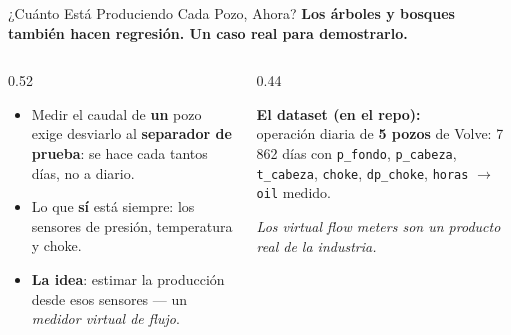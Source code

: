 \documentclass[aspectratio=169, 11pt]{beamer}
\begin{document}
\begin{frame}[shrink=8]{¿Cuánto Está Produciendo Cada Pozo, Ahora?}
  \vspace{-4pt}
  {\small\color{arcaDark}\bfseries
    Los árboles y bosques también hacen \textbf{regresión}. Un caso real para demostrarlo.}

  \vspace{6pt}
  \begin{columns}[T]
    \begin{column}{0.52\textwidth}
      {\footnotesize\color{textMuted}
      \begin{itemize}\setlength{\itemsep}{6pt}
        \item[{\color{arcaRed}\scriptsize\faFlask}]
          Medir el caudal de \textbf{un} pozo exige desviarlo al
          \textbf{separador de prueba}: se hace cada tantos días,
          no a diario.
        \item[{\color{arcaRed}\scriptsize\faBolt}]
          Lo que \textbf{sí} está siempre: los sensores de presión,
          temperatura y choke.
        \item[{\color{codeGreen}\scriptsize\faLightbulb}]
          \textbf{La idea}: estimar la producción desde esos
          sensores --- un \textit{medidor virtual de flujo}.
      \end{itemize}
      }
    \end{column}
    \begin{column}{0.44\textwidth}
      \begin{tcolorbox}[colback=arcaGray, colframe=arcaRed, boxrule=0pt, leftrule=3pt,
        arc=3pt, left=6pt, right=6pt, top=5pt, bottom=5pt]
        {\scriptsize\color{arcaDark}\bfseries El dataset (en el repo):}\\[4pt]
        {\scriptsize\color{textMuted}
          operación diaria de \textbf{5 pozos} de Volve:
          7\,862 días con \texttt{p\_fondo}, \texttt{p\_cabeza},
          \texttt{t\_cabeza}, \texttt{choke}, \texttt{dp\_choke},
          \texttt{horas} \(\to\) \texttt{oil} medido.}
      \end{tcolorbox}
      \vspace{4pt}
      {\scriptsize\color{textMuted}\itshape
        Los \textit{virtual flow meters} son un producto
        real de la industria.}
    \end{column}
  \end{columns}
\end{frame}
\end{document}
